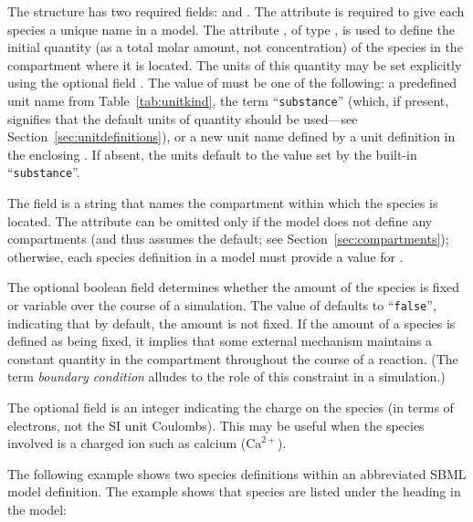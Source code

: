 \documentclass[10pt]{cekarticle}
\newcommand{\changed}[1]{\textcolor{BrickRed}{#1}}
\newenvironment{blockChanged}{\color{BrickRed}}{}
\begin{document}
\begin{blockChanged}
The  structure has two required fields: 
and .  The attribute  is required to
give each species a unique name in a model.  The attribute
, of type , is used to define the
initial quantity (as a total molar amount, not concentration) of the
species in the compartment where it is located.  The units of this quantity
may be set explicitly using the optional field .  The
value of  must be one of the following: a predefined unit
name from Table~\ref{tab:unitkind}, the term ``\texttt{substance}'' (which,
if present, signifies that the default units of quantity should be
used---see Section~\ref{sec:unitdefinitions}), or a new unit name defined
by a unit definition in the enclosing .  If absent, the
units default to the value set by the built-in ``\texttt{substance}''.

The field  is a string that names the compartment
within which the species is located.  The attribute can be omitted only if
the model does not define any compartments (and thus assumes the default;
see Section~\ref{sec:compartments}); otherwise, each species definition in
a model must provide a value for .
\end{blockChanged}

The optional boolean field  determines whether
the amount of the \changed{species} is fixed or variable over the course of
a simulation.  The value of  defaults to
``\texttt{false}'', indicating that by default, the amount is not fixed.
\changed{If the amount of a species is defined as being fixed, it
implies that some external mechanism maintains a constant quantity in the
compartment throughout the course of a reaction.  (The term \emph{boundary
  condition} alludes to the role of this constraint in a simulation.)}

The optional field  is an integer indicating the charge on
the species (in terms of electrons, not the SI unit Coulombs).  This may be
useful when the \changed{species} involved is a charged ion such as calcium
(\changed{$\text{Ca}^{2+}$}).

The following example shows two \changed{species} definitions within an
abbreviated SBML model definition.  The example shows that species are
listed under the heading  in the model:
\end{document}
